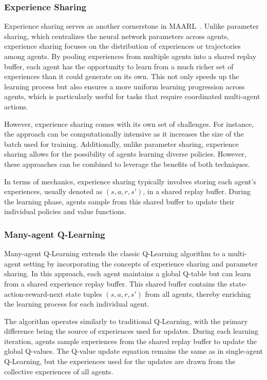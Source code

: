 \subsubsection*{Experience Sharing}
Experience sharing serves as another cornerstone in \ac{MAARL}~\cite{albrecht2023multi}.
 Unlike parameter sharing, which centralizes the neural network parameters across agents, 
 experience sharing focuses on the distribution of experiences or trajectories among agents.
By pooling experiences from multiple agents into a shared replay buffer, 
 each agent has the opportunity to learn from a much richer set of experiences than it could generate on its own. 
 This not only speeds up the learning process but also ensures a more uniform learning progression across agents, which is particularly useful for tasks that require coordinated multi-agent actions.

However, experience sharing comes with its own set of challenges. 
 For instance, the approach can be computationally intensive as it increases the size of the batch used for training. Additionally, unlike parameter sharing, 
 experience sharing allows for the possibility of agents learning diverse policies. 
 However, these approaches can be combined to leverage the benefits of both techniques.

In terms of mechanics, 
 experience sharing typically involves storing each agent's experiences, 
 usually denoted as \( (s, a, r, s') \), in a shared replay buffer. 
 During the learning phase, agents sample from this shared buffer to update their individual policies and value functions. 

\subsubsection*{Many-agent Q-Learning}
Many-agent Q-Learning extends the classic Q-Learning algorithm to a multi-agent setting by incorporating the concepts of experience sharing and parameter sharing. 
 In this approach, each agent maintains a global Q-table but can learn from a shared experience replay buffer. 
 This shared buffer contains the state-action-reward-next state tuples \( (s, a, r, s') \) from all agents, 
 thereby enriching the learning process for each individual agent.
 
The algorithm operates similarly to traditional Q-Learning, 
 with the primary difference being the source of experiences used for updates. 
 During each learning iteration, agents sample experiences from the shared replay buffer to update the global Q-values. 
 The Q-value update equation remains the same as in single-agent Q-Learning, 
 but the experiences used for the updates are drawn from the collective experiences of all agents.
 
